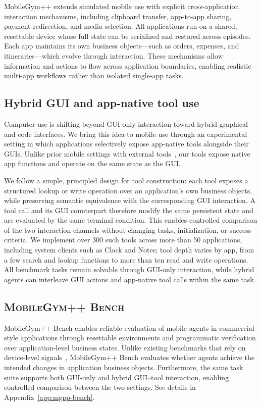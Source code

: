 MobileGym++ extends simulated mobile use with explicit cross-application interaction mechanisms, including clipboard transfer, app-to-app sharing, payment redirection, and media selection.
All applications run on a shared, resettable device whose full state can be serialized and restored across episodes. Each app maintains its own business objects---such as orders, expenses, and itineraries---which evolve through interaction. These mechanisms allow information and actions to flow across application boundaries, enabling realistic multi-app workflows rather than isolated single-app tasks.

\subsection{Hybrid GUI and app-native tool use}
\label{sec:mgpp-tools}


Computer use is shifting beyond GUI-only interaction toward hybrid graphical and code interfaces.
We bring this idea to mobile use through an experimental setting in which applications selectively expose app-native tools alongside their GUIs. 
Unlike prior mobile settings with external tools~\citep{kong2026mobileworld}, our tools expose native app functions and operate on the same state as the GUI.

We follow a simple, principled design for tool construction: each tool exposes a structured lookup or write operation over an application's own business objects, while preserving semantic equivalence with the corresponding GUI interaction. A tool call and its GUI counterpart therefore modify the same persistent state and are evaluated by the same terminal condition.
This enables controlled comparison of the two interaction channels without changing tasks, initialization, or success criteria.
We implement over 300 such tools across more than 50 applications, including system clients such as Clock and Notes; tool depth varies by app, from a few search and lookup functions to more than ten read and write operations. All benchmark tasks remain solvable through GUI-only interaction, while hybrid agents can interleave GUI actions and app-native tool calls within the same task.



\subsection{\textsc{MobileGym++ Bench}}
\label{sec:mgpp-bench}

MobileGym++ Bench enables reliable evaluation of mobile agents in commercial-style applications through resettable environments and programmatic verification over application-level business states. Unlike existing benchmarks that rely on device-level signals~\citep{rawles2025androidworld,kong2026mobileworld}, MobileGym++ Bench evaluates whether agents achieve the intended changes in application business objects. Furthermore, the same task suite supports both GUI-only and hybrid GUI–tool interaction, enabling controlled comparison between the two settings. See details in Appendix~\ref{app:mgpp-bench}.

